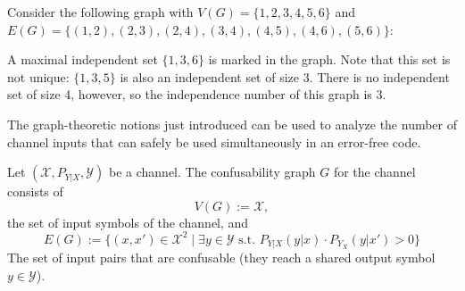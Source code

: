 \begin{example}
Consider the following graph with $V(G) = \{1,2,3,4,5,6\}$ and $E(G) = \{(1,2), (2,3), (2,4), (3,4), (4,5), (4,6), (5,6)\}$:
\begin{center}
\end{center}
A maximal independent set $\{1,3,6\}$ is marked in the graph. Note that this set is not unique: $\{1,3,5\}$ is also an independent set of size 3. There is no independent set of size 4, however, so the independence number of this graph is 3.
\end{example}
The graph-theoretic notions just introduced can be used to analyze the number of channel inputs that can safely be used simultaneously in an error-free code.
\begin{definition}
Let $(\mathcal{X},P_{Y|X},\mathcal{Y})$ be a channel. The confusability graph $G$ for the channel consists of
\[V(G) := \mathcal{X},\]
the set of input symbols of the channel, and
\[
E(G) := \{(x,x') \in \mathcal{X}^2 \mid \exists y \in \mathcal{Y} \mbox{ s.t. } P_{Y|X}(y|x) \cdot P_{Y_X}(y|x') > 0\}
\]
The set of input pairs that are confusable (they reach a shared output symbol $y \in \mathcal{Y}$).
\end{definition}

